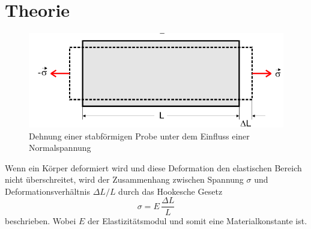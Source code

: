 \section{Theorie}
\label{sec:Theorie}




\begin{figure}
    \centering
    \includegraphics[width=\textwidth/2]{images/skizze_1.png}
    \caption{Dehnung einer stabförmigen Probe unter dem Einfluss einer Normalspannung\cite{V103}}
    \label{fig:skizze_1}
\end{figure}
Wenn ein Körper deformiert wird und diese Deformation den elastischen Bereich nicht überschreitet, wird der Zusammenhang zwischen Spannung $\sigma$ und Deformationsverhältnis $\Delta L / L$ durch das Hookesche Gesetz
\begin{equation}
    \sigma = E \, \frac{\Delta L}{L}
    \label{eq:hookesches_gesetz}
\end{equation}
beschrieben. \cite{V103}
Wobei $E$ der Elastizitätsmodul und somit eine Materialkonstante ist.
 
